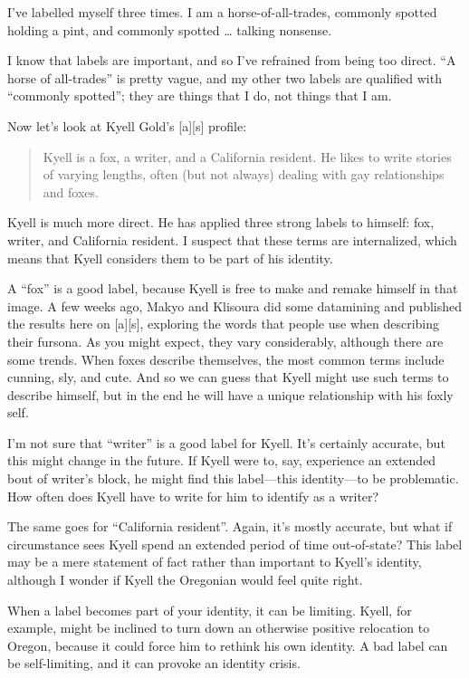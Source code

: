 I've labelled myself three times. I am a horse-of-all-trades, commonly spotted holding a pint, and commonly spotted … talking nonsense.

I know that labels are important, and so I've refrained from being too direct. ``A horse of all-trades'' is pretty vague, and my other two labels are qualified with ``commonly spotted''; they are things that I do, not things that I am.

Now let's look at Kyell Gold's [a][s] profile:

\begin{quote}
  Kyell is a fox, a writer, and a California resident. He likes to write stories of varying lengths, often (but not always) dealing with gay relationships and foxes.
\end{quote}

Kyell is much more direct. He has applied three strong labels to himself: fox, writer, and California resident. I suspect that these terms are internalized, which means that Kyell considers them to be part of his identity.

A ``fox'' is a good label, because Kyell is free to make and remake himself in that image. A few weeks ago, Makyo and Klisoura did some datamining and published the results here on [a][s], exploring the words that people use when describing their fursona. As you might expect, they vary considerably, although there are some trends. When foxes describe themselves, the most common terms include cunning, sly, and cute. And so we can guess that Kyell might use such terms to describe himself, but in the end he will have a unique relationship with his foxly self.

I'm not sure that ``writer'' is a good label for Kyell. It's certainly accurate, but this might change in the future. If Kyell were to, say, experience an extended bout of writer's block, he might find this label—this identity—to be problematic. How often does Kyell have to write for him to identify as a writer?

The same goes for ``California resident''. Again, it's mostly accurate, but what if circumstance sees Kyell spend an extended period of time out-of-state? This label may be a mere statement of fact rather than important to Kyell's identity, although I wonder if Kyell the Oregonian would feel quite right.

When a label becomes part of your identity, it can be limiting. Kyell, for example, might be inclined to turn down an otherwise positive relocation to Oregon, because it could force him to rethink his own identity. A bad label can be self-limiting, and it can provoke an identity crisis.

